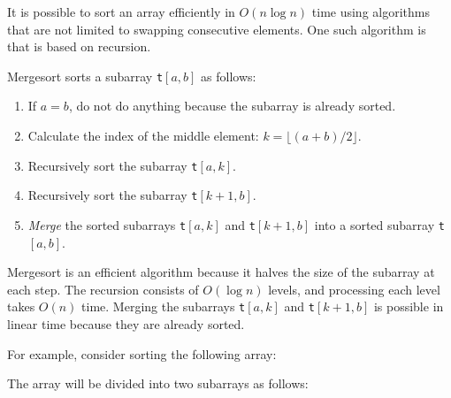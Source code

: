 It is possible to sort an array efficiently
in $O(n \log n)$ time using algorithms
that are not limited to swapping consecutive elements.
One such algorithm is 
that is based on recursion.

Mergesort sorts a subarray \texttt{t}$[a,b]$ as follows:

\begin{enumerate}
\item If $a=b$, do not do anything because the subarray is already sorted.
\item Calculate the index of the middle element: $k=\lfloor (a+b)/2 \rfloor$.
\item Recursively sort the subarray \texttt{t}$[a,k]$.
\item Recursively sort the subarray \texttt{t}$[k+1,b]$.
\item \emph{Merge} the sorted subarrays \texttt{t}$[a,k]$ and \texttt{t}$[k+1,b]$
into a sorted subarray \texttt{t}$[a,b]$.
\end{enumerate}

Mergesort is an efficient algorithm because it
halves the size of the subarray at each step.
The recursion consists of $O(\log n)$ levels,
and processing each level takes $O(n)$ time.
Merging the subarrays \texttt{t}$[a,k]$ and \texttt{t}$[k+1,b]$
is possible in linear time because they are already sorted.

For example, consider sorting the following array:
\begin{center}
\end{center}

The array will be divided into two subarrays
as follows:
\begin{center}
\end{center}

